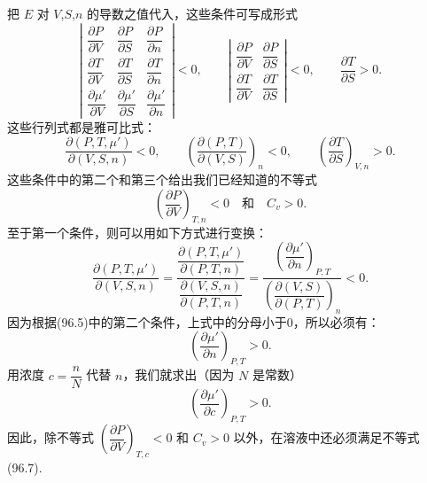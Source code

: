 把 $E$ 对 $V$,$S$,$n$ 的导数之值代入，这些条件可写成形式
\begin{equation*}
  \left|\begin{array}{lll}
    \dfrac{\partial P}{\partial V} & \dfrac{\partial P}{\partial S} & \dfrac{\partial P}{\partial n}\\[2ex]
    \dfrac{\partial T}{\partial V} & \dfrac{\partial T}{\partial S} & \dfrac{\partial T}{\partial n}\\[2ex]
    \dfrac{\partial\mu'}{\partial V} & \dfrac{\partial\mu'}{\partial S} & \dfrac{\partial\mu'}{\partial n}
  \end{array}\right|<0,\qquad
  \left|\begin{array}{ll}
    \dfrac{\partial P}{\partial V} & \dfrac{\partial P}{\partial S}\\[2ex]
    \dfrac{\partial T}{\partial V} & \dfrac{\partial T}{\partial S}
  \end{array}\right|<0,\qquad
  \frac{\partial T}{\partial S}>0.
\end{equation*}
这些行列式都是雅可比式：
\begin{equation}
  \frac{\partial(P,T,\mu')}{\partial(V,S,n)}<0,\qquad
  \left(\frac{\partial(P,T)}{\partial(V,S)}\right)_n<0,\qquad
  \left(\frac{\partial T}{\partial S}\right)_{V,n}>0.
\end{equation}
这些条件中的第二个和第三个给出我们已经知道的不等式
\begin{equation*}
  \left(\frac{\partial P}{\partial V}\right)_{T,n}<0 \quad\text{和}\quad C_v>0.
\end{equation*}
至于第一个条件，则可以用如下方式进行变换：
\begin{equation*}
  \frac{\partial(P,T,\mu')}{\partial(V,S,n)}
  =\frac{\dfrac{\partial(P,T,\mu')}{\partial(P,T,n)}}
  {\dfrac{\partial(V,S,n)}{\partial(P,T,n)}}
  =\frac{\left(\dfrac{\partial\mu'}{\partial n}\right)_{P,T}}
  {\left(\dfrac{\partial(V,S)}{\partial(P,T)}\right)_n}<0.
\end{equation*}
因为根据(96.5)中的第二个条件，上式中的分母小于0，所以必须有：
\begin{equation}
  \left(\frac{\partial\mu'}{\partial n}\right)_{P,T}>0.
\end{equation}
用浓度 $c=\dfrac{n}{N}$ 代替 $n$，我们就求出（因为 $N$ 是常数）
\begin{equation}
  \left(\frac{\partial\mu'}{\partial c}\right)_{P,T}>0.
\end{equation}
因此，除不等式 $\left(\dfrac{\partial P}{\partial V}\right)_{T,c}<0$ 和 $C_v>0$ 以外，在溶液中还必须满足不等式(96.7).

